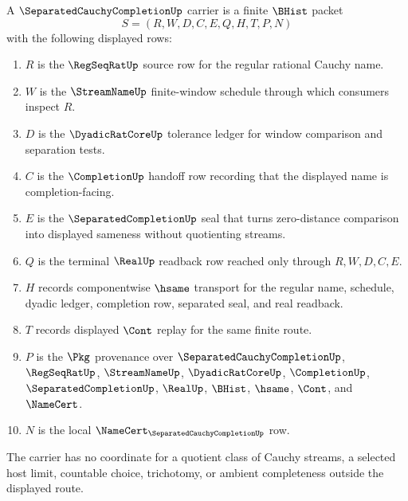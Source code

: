 \begin{definition}
\label{def:separated-cauchy-completion-carrier}
A $\SeparatedCauchyCompletionUp$ carrier is a finite $\BHist$ packet
$$
S=(R,W,D,C,E,Q,H,T,P,N)
$$
with the following displayed rows:
\begin{enumerate}
\item $R$ is the $\RegSeqRatUp$ source row for the regular rational Cauchy name.
\item $W$ is the $\StreamNameUp$ finite-window schedule through which consumers inspect $R$.
\item $D$ is the $\DyadicRatCoreUp$ tolerance ledger for window comparison and separation tests.
\item $C$ is the $\CompletionUp$ handoff row recording that the displayed name is completion-facing.
\item $E$ is the $\SeparatedCompletionUp$ seal that turns zero-distance comparison into displayed sameness without quotienting streams.
\item $Q$ is the terminal $\RealUp$ readback row reached only through $R,W,D,C,E$.
\item $H$ records componentwise $\hsame$ transport for the regular name, schedule, dyadic ledger, completion row, separated seal, and real readback.
\item $T$ records displayed $\Cont$ replay for the same finite route.
\item $P$ is the $\Pkg$ provenance over $\SeparatedCauchyCompletionUp$, $\RegSeqRatUp$, $\StreamNameUp$, $\DyadicRatCoreUp$, $\CompletionUp$, $\SeparatedCompletionUp$, $\RealUp$, $\BHist$, $\hsame$, $\Cont$, and $\NameCert$.
\item $N$ is the local $\NameCert_{\SeparatedCauchyCompletionUp}$ row.
\end{enumerate}
The carrier has no coordinate for a quotient class of Cauchy streams, a selected host limit, countable choice, trichotomy, or ambient completeness outside the displayed route.
\end{definition}

